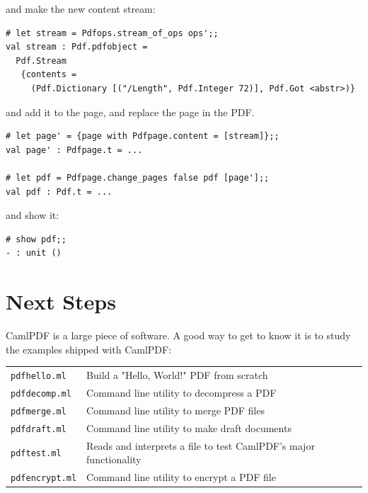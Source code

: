\documentclass[a4paper]{memoir}
\newcommand{\smallgap}{\vspace{4mm}}
\begin{document}
\noindent and make the new content stream:

\begin{framed}
\small\begin{verbatim}
# let stream = Pdfops.stream_of_ops ops';;
val stream : Pdf.pdfobject =
  Pdf.Stream
   {contents =
     (Pdf.Dictionary [("/Length", Pdf.Integer 72)], Pdf.Got <abstr>)}
\end{verbatim}
\end{framed}

\noindent and add it to the page, and replace the page in the PDF.

\begin{framed}
\small\begin{verbatim}
# let page' = {page with Pdfpage.content = [stream]};;
val page' : Pdfpage.t = ...

# let pdf = Pdfpage.change_pages false pdf [page'];;
val pdf : Pdf.t = ...
\end{verbatim}
\end{framed}

\noindent and show it:

\begin{framed}
\small\begin{verbatim}
# show pdf;;
- : unit ()
\end{verbatim}
\end{framed}

\section*{Next Steps}

\noindent CamlPDF is a large piece of software. A good way to get to know it is to study the examples shipped with \textsf{CamlPDF}:
\smallgap

{\centering\small
\begin{tabular}{ll}
\texttt{pdfhello.ml} & Build a "Hello, World!" PDF from scratch\\
\texttt{pdfdecomp.ml} & Command line utility to decompress a PDF\\
\texttt{pdfmerge.ml} & Command line utility to merge PDF files\\
\texttt{pdfdraft.ml} & Command line utility to make draft documents\\
\texttt{pdftest.ml} & Reads and interprets a file to test CamlPDF's major functionality\\
\texttt{pdfencrypt.ml} & Command line utility to encrypt a PDF file\\
\end{tabular}
}
\end{document}
